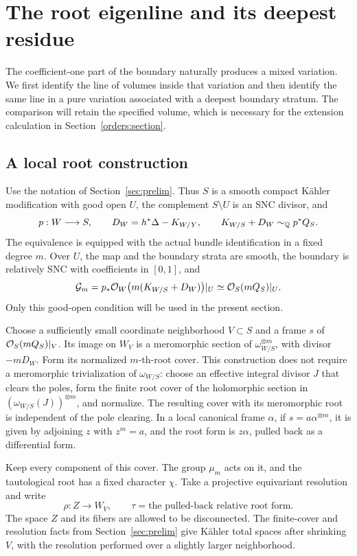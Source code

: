\section{The root eigenline and its deepest residue}
\label{hodge:section}

The coefficient-one part of the boundary naturally produces a mixed
variation.  We first identify the line of volumes inside that variation
and then identify the same line in a pure variation associated with a
deepest boundary stratum.  The comparison will retain the specified
volume, which is necessary for the extension calculation in
Section~\ref{orders:section}.

\subsection{A local root construction}
\label{hodge:rootconstruction}

Use the notation of Section~\ref{sec:prelim}.  Thus \(S\) is a smooth
compact K\"ahler modification with good open \(U\), the complement
\(S\setminus U\) is an SNC divisor, and
\[
 p:W\longrightarrow S,\qquad
 D_W=h^*\Delta-K_{W/Y},\qquad
 K_{W/S}+D_W\sim_{\mathbb Q}p^*Q_S.
\]
The equivalence is equipped with the actual bundle identification in a
fixed degree \(m\).  Over \(U\), the map and the boundary strata are
smooth, the boundary is relatively SNC with coefficients in \([0,1]\),
and
\[
 \mathcal G_m
 =p_*\mathcal O_W\bigl(m(K_{W/S}+D_W)\bigr)|_U
 \simeq \mathcal O_S(mQ_S)|_U.
\]
Only this good-open condition will be used in the present section.

Choose a sufficiently small coordinate neighborhood \(V\subset S\)
and a frame \(s\) of \(\mathcal O_S(mQ_S)|_V\).  Its image on \(W_V\) is a
meromorphic section of \(\omega_{W/S}^{\otimes m}\), with divisor
\(-mD_W\).  Form its normalized \(m\)-th-root cover.  This construction
does not require a meromorphic trivialization of \(\omega_{W/S}\):
choose an effective integral divisor \(J\) that clears the poles, form
the finite root cover of the holomorphic section in
\((\omega_{W/S}(J))^{\otimes m}\), and normalize.  The resulting cover
with its meromorphic root is independent of the pole clearing.  In a
local canonical frame \(\alpha\), if \(s=a\alpha^{\otimes m}\), it is
given by adjoining \(z\) with \(z^m=a\), and the root form is
\(z\alpha\), pulled back as a differential form.

Keep every component of this cover.  The group \(\mu_m\) acts on it,
and the tautological root has a fixed character \(\chi\).  Take a
projective equivariant resolution and write
\[
 \rho:Z\longrightarrow W_V,\qquad
 \tau=\text{the pulled-back relative root form}.
\]
The space \(Z\) and its fibers are allowed to be disconnected.  The
finite-cover and resolution facts from Section~\ref{sec:prelim}
give K\"ahler total spaces after shrinking \(V\), with the resolution
performed over a slightly larger neighborhood.

